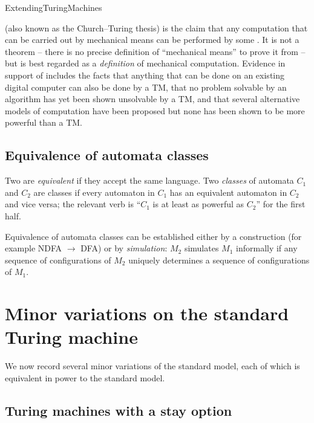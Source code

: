 \documentclass[hidelinks]{article}
\begin{document}
\begin{smodule}[title={Extending Turing Machine Definitions}]{ExtendingTuringMachines}
\begin{sdefinition}[for=Turing's thesis]
 (also known as the Church--Turing thesis) is the claim that any computation that can be carried out by mechanical means can be performed by some . It is not a theorem -- there is no precise definition of ``mechanical means'' to prove it from -- but is best regarded as a \emph{definition} of mechanical computation. Evidence in support of  includes the facts that anything that can be done on an existing digital computer can also be done by a TM, that no problem solvable by an algorithm has yet been shown unsolvable by a TM, and that several alternative models of computation have been proposed but none has been shown to be more powerful than a TM.
\end{sdefinition}

\subsection{Equivalence of automata classes}

\begin{sdefinition}[for=equivalent automata]
Two  are \emph{equivalent} if they accept the same language. Two \emph{classes} of automata $C_1$ and $C_2$ are  classes if every automaton in $C_1$ has an equivalent automaton in $C_2$ and vice versa; the relevant verb is ``$C_1$ is at least as powerful as $C_2$'' for the first half.
\end{sdefinition}

Equivalence of automata classes can be established either by a construction (for example NDFA $\to$ DFA) or by \emph{simulation}: $M_2$ simulates $M_1$ informally if any sequence of configurations of $M_2$ uniquely determines a sequence of configurations of $M_1$.

\section{Minor variations on the standard Turing machine}

We now record several minor variations of the standard  model, each of which is equivalent in power to the standard model.

\subsection{Turing machines with a stay option}


\end{smodule}
\end{document}
